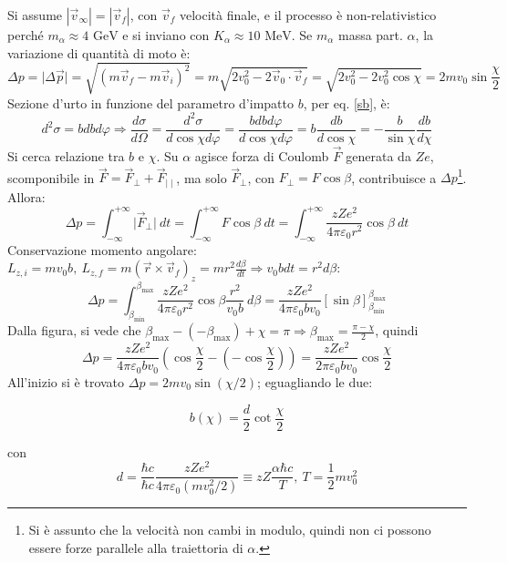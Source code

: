 \documentclass[10pt, a4paper]{scrartcl}
\numberwithin{equation}{subsection}
\theoremstyle{style1}
\newenvironment{boxenv}[1][]{
    \begin{eqbox}[#1]
    }{
   \end{eqbox}
}
\begin{document}
\noindent Si assume $|\vec{v}_\infty| = |\vec{v}_f|$, con $\vec{v}_f$ velocit\`a finale, e il processo \`e non-relativistico perch\'e $m_\alpha \approx 4 \text{ GeV}$ e si inviano con $K_\alpha \approx 10 \text{ MeV}$. Se $m_\alpha $ massa part. $\alpha $, la variazione di quantit\`a di moto \`e:
\[
\Delta p = \lvert \Delta \vec{p} \rvert = \sqrt{(m\vec{v}_f- m \vec{v}_i)^2} = m \sqrt{2v_0^2 - 2 \vec{v}_0 \cdot \vec{v}_f}  = \sqrt{2v_0^2 - 2 v_0^2 \cos \chi  }  = 2 m v_0 \sin \frac{\chi }{2}
\] 
Sezione d'urto in funzione del parametro d'impatto $b$, per eq. \ref{sb}, \`e:
\[
d^2 \sigma = bdbd\varphi  \Rightarrow \frac{d \sigma }{d \Omega } = \frac{d^2 \sigma }{d \cos\chi  d \varphi  } = \frac{b db d\varphi  }{d\cos \chi   d \varphi  }= b \frac{d b}{d \cos \chi  } =- \frac{b}{\sin \chi  } \frac{d b}{d \chi  } 
\] 
Si cerca relazione tra $b$ e $\chi  $. Su $\alpha $ agisce forza di Coulomb $\vec{F}$ generata da $Ze$, scomponibile in $\vec{F} = \vec{F}_\perp + \vec{F}_{ \mid  \mid }$, ma solo $\vec{F}_\perp$, con $F_\perp = F \cos \beta $, contribuisce a $\Delta p$\footnote{Si \`e assunto che la velocit\`a non cambi in modulo, quindi non ci possono essere forze parallele alla traiettoria di $\alpha $.}. Allora:
\[
	\Delta  p = \int_{-\infty} ^{+\infty} \lvert \vec{F}_\perp \rvert  \ dt = \int_{-\infty} ^{+\infty} F \cos \beta  \ dt = \int_{ -\infty } ^{+\infty}  \frac{zZe^2 }{ 4\pi \varepsilon _0 r^2} \cos \beta \ dt
\] 
Conservazione momento angolare: $L_{z,i} = mv_0b, \ L_{z,f} = m (\vec{r}\times \vec{v}_f)_z = mr^2 \frac{d \beta }{d t} \Rightarrow v_0 b dt = r ^2 d\beta $:
\[
\Delta p = \int_{\beta _\text{min}} ^{\beta _\text{max}} \frac{zZe^2}{4\pi \varepsilon _0 r^2} \cos \beta \frac{r^2 }{v_0 b} \ d\beta = \frac{zZe^2}{4\pi \varepsilon _0 b v_0} \left[ \sin \beta  \right] _{\beta _\text{min}} ^{\beta _\text{max}} 
\] 
Dalla figura, si vede che $\beta _\text{max}- (-\beta _\text{max}) + \chi   = \pi\Rightarrow  \beta _\text{max}=\frac{\pi - \chi  }{2}$, quindi
\[
\Delta  p = \frac{zZe^2}{4\pi \varepsilon _0bv_0} \left(\cos \frac{\chi }{2} - \left(- \cos \frac{\chi }{2}\right) \right) = \frac{zZe^2 }{2\pi \varepsilon _0 bv_0} \cos \frac{\chi }{2}
\] 
All'inizio si \`e trovato $\Delta p = 2m v_0 \sin (\chi  /2)$; eguagliando le due:
\begin{boxenv}[]
\begin{equation}
	b(\chi  ) = \frac{d}{2} \cot \frac{\chi }{2}
\end{equation}
\end{boxenv}
\noindent con 
\[
	d = \frac{\hbar c}{\hbar c} \frac{zZe^2}{4\pi \varepsilon _0 (mv_0^2 / 2)}\equiv zZ \frac{\alpha \hbar  c}{T}, \ T = \frac{1}{2} m v_0^2
\] 
\end{document}
